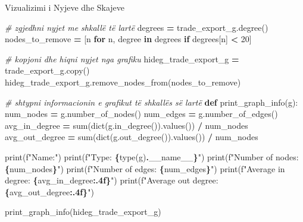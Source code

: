 \documentclass[
  ignorenonframetext,
]{beamer}
\newenvironment{Shaded}{\begin{snugshade}}{\end{snugshade}}
\newcommand{\BuiltInTok}[1]{#1}
\newcommand{\CommentTok}[1]{\textcolor[rgb]{0.56,0.35,0.01}{\textit{#1}}}
\newcommand{\ControlFlowTok}[1]{\textcolor[rgb]{0.13,0.29,0.53}{\textbf{#1}}}
\newcommand{\DecValTok}[1]{\textcolor[rgb]{0.00,0.00,0.81}{#1}}
\newcommand{\KeywordTok}[1]{\textcolor[rgb]{0.13,0.29,0.53}{\textbf{#1}}}
\newcommand{\NormalTok}[1]{#1}
\newcommand{\OperatorTok}[1]{\textcolor[rgb]{0.81,0.36,0.00}{\textbf{#1}}}
\newcommand{\SpecialCharTok}[1]{\textcolor[rgb]{0.81,0.36,0.00}{\textbf{#1}}}
\newcommand{\SpecialStringTok}[1]{\textcolor[rgb]{0.31,0.60,0.02}{#1}}
\newcommand{\VariableTok}[1]{\textcolor[rgb]{0.00,0.00,0.00}{#1}}
\begin{document}
\begin{frame}[fragile]{Vizualizimi i Nyjeve dhe Skajeve}
\protect\hypertarget{vizualizimi-i-nyjeve-dhe-skajeve-4}{}

\begin{Shaded}
\begin{Highlighting}[]
\CommentTok{\# zgjedhni nyjet me shkallë të lartë}
\NormalTok{degrees }\OperatorTok{=}\NormalTok{ trade\_export\_g.degree()}
\NormalTok{nodes\_to\_remove }\OperatorTok{=}\NormalTok{ [n }\ControlFlowTok{for}\NormalTok{ n, degree }\KeywordTok{in}\NormalTok{ degrees }\ControlFlowTok{if}\NormalTok{ degrees[n] }\OperatorTok{\textless{}} \DecValTok{20}\NormalTok{]}

\CommentTok{\# kopjoni dhe hiqni nyjet nga grafiku}
\NormalTok{hideg\_trade\_export\_g }\OperatorTok{=}\NormalTok{ trade\_export\_g.copy()}
\NormalTok{hideg\_trade\_export\_g.remove\_nodes\_from(nodes\_to\_remove)}

\CommentTok{\# shtypni informacionin e grafikut të shkallës së lartë}
\KeywordTok{def}\NormalTok{ print\_graph\_info(g):}
\NormalTok{    num\_nodes }\OperatorTok{=}\NormalTok{ g.number\_of\_nodes()}
\NormalTok{    num\_edges }\OperatorTok{=}\NormalTok{ g.number\_of\_edges()}
\NormalTok{    avg\_in\_degree }\OperatorTok{=} \BuiltInTok{sum}\NormalTok{(}\BuiltInTok{dict}\NormalTok{(g.in\_degree()).values()) }\OperatorTok{/}\NormalTok{ num\_nodes}
\NormalTok{    avg\_out\_degree }\OperatorTok{=} \BuiltInTok{sum}\NormalTok{(}\BuiltInTok{dict}\NormalTok{(g.out\_degree()).values()) }\OperatorTok{/}\NormalTok{ num\_nodes}

    \BuiltInTok{print}\NormalTok{(}\SpecialStringTok{f"Name:"}\NormalTok{)}
    \BuiltInTok{print}\NormalTok{(}\SpecialStringTok{f"Type: }\SpecialCharTok{\{}\BuiltInTok{type}\NormalTok{(g)}\SpecialCharTok{.}\VariableTok{\_\_name\_\_}\SpecialCharTok{\}}\SpecialStringTok{"}\NormalTok{)}
    \BuiltInTok{print}\NormalTok{(}\SpecialStringTok{f"Number of nodes: }\SpecialCharTok{\{}\NormalTok{num\_nodes}\SpecialCharTok{\}}\SpecialStringTok{"}\NormalTok{)}
    \BuiltInTok{print}\NormalTok{(}\SpecialStringTok{f"Number of edges: }\SpecialCharTok{\{}\NormalTok{num\_edges}\SpecialCharTok{\}}\SpecialStringTok{"}\NormalTok{)}
    \BuiltInTok{print}\NormalTok{(}\SpecialStringTok{f"Average in degree: }\SpecialCharTok{\{}\NormalTok{avg\_in\_degree}\SpecialCharTok{:.4f\}}\SpecialStringTok{"}\NormalTok{)}
    \BuiltInTok{print}\NormalTok{(}\SpecialStringTok{f"Average out degree: }\SpecialCharTok{\{}\NormalTok{avg\_out\_degree}\SpecialCharTok{:.4f\}}\SpecialStringTok{"}\NormalTok{)}

\NormalTok{print\_graph\_info(hideg\_trade\_export\_g)}
\end{Highlighting}
\end{Shaded}
\end{frame}
\end{document}
